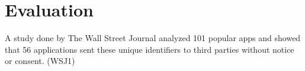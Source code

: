 \section{Evaluation}

A study done by The Wall Street Journal analyzed 101 popular apps and showed that 56 applications sent these unique identifiers to third parties without notice or consent. (WSJ1) 
